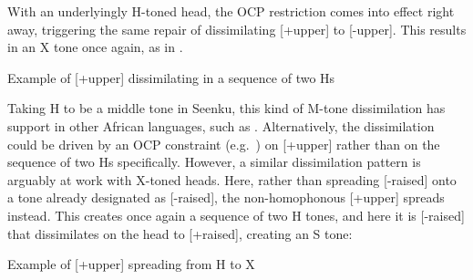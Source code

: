 \documentclass[output=paper]{langsci/langscibook}
\begin{document}
With an underlyingly H-toned head, the OCP restriction comes into effect right away, triggering the same repair of dissimilating [+upper] to [-upper]. This results in an X tone once again, as in .

\ea\label{ex:mcpherson:24} Example of [+upper] dissimilating in a sequence of two Hs \\
\z

Taking H to be a middle tone in Seenku, this kind of M-tone dissimilation has support in other African languages, such as  \citep{Paster03}. Alternatively, the dissimilation could be driven by an OCP constraint (e.g.\ \citealt{McCarthy86}) on [+upper] rather than on the sequence of two Hs specifically. However, a similar dissimilation pattern is arguably at work with X-toned heads. Here, rather than spreading [-raised] onto a tone already designated as [-raised], the non-homophonous [+upper] spreads instead. This creates once again a sequence of two H tones, and here it is [-raised] that dissimilates on the head to [+raised], creating an S tone:

\ea\label{ex:mcpherson:25} Example of [+upper] spreading from H to X \\
\z
\end{document}
